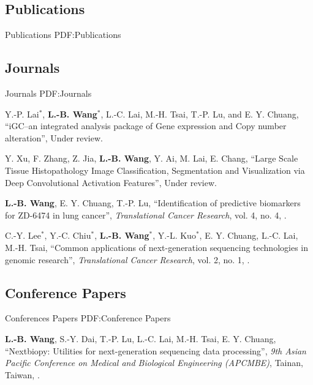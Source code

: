 \documentclass[a4paper,12pt,oneside]{article}
\begin{document}
\begin{body}

\section
{Publications}
{Publications}
{PDF:Publications}

\subsection
{Journals}
{Journals}
{PDF:Journals}

\begin{publication}[series=pub, widest*=100]

    \item Y.-P. Lai$^*$, \textbf{L.-B. Wang}$^*$, L.-C. Lai, M.-H. Tsai, T.-P. Lu, and E. Y. Chuang,
        ``iGC–an integrated analysis package of Gene expression and Copy number alteration'',
        Under review.

    \item
        Y. Xu, F. Zhang, Z. Jia, \textbf{L.-B. Wang}, Y. Ai, M. Lai, E. Chang,
        ``Large Scale Tissue Histopathology Image Classification, Segmentation and Visualization via Deep Convolutional Activation Features'',
        Under review.

    \item
        \textbf{L.-B. Wang}, E. Y. Chuang, T.-P. Lu,
        ``Identification of predictive biomarkers for ZD-6474 in lung cancer'',
        \textit{Translational Cancer Research}, vol. 4, no. 4,
        .

    \item
        C.-Y. Lee$^*$, Y.-C. Chiu$^*$, \textbf{L.-B. Wang}$^*$, Y.-L. Kuo$^*$, E. Y. Chuang, L.-C. Lai, M.-H. Tsai,
        ``Common applications of next-generation sequencing technologies in genomic research'',
        \textit{Translational Cancer Research}, vol. 2, no. 1,
        .
\end{publication}

\BigEntryGap
\subsection
{Conference Papers}
{Conferences Papers}
{PDF:Conference Papers}

\begin{publication}[widest*=100]  %

    \item
        \textbf{L.-B. Wang}, S.-Y. Dai, T.-P. Lu, L.-C. Lai, M.-H. Tsai, E. Y. Chuang,
        ``Nextbiopy: Utilities for next-generation sequencing data processing'',
        \textit{9th Asian Pacific Conference on Medical and Biological Engineering (APCMBE)},
        Tainan, Taiwan,
        .


\end{publication}
\end{body}
\end{document}
